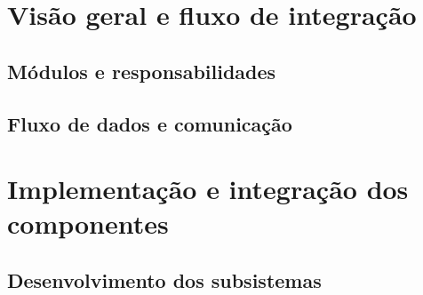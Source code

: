 \section{Visão geral e fluxo de integração}
\label{sec:visao-geral-integracao}

%

\subsection{Módulos e responsabilidades}
\label{subsec:modulos-responsabilidades}


\subsection{Fluxo de dados e comunicação}
\label{subsec:fluxo-dados-comunicacao}


\section{Implementação e integração dos componentes}
\label{sec:implementacao-integracao}


\subsection{Desenvolvimento dos subsistemas}
\label{subsec:desenvolvimento-subsistemas}


